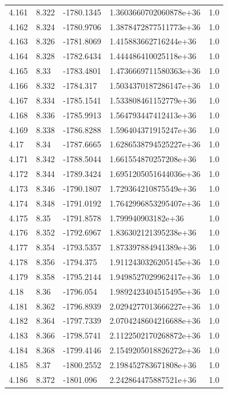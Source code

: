 \begin{tabular}{lllll}
4.161 & 8.322 & -1780.1345 & 1.3603660702060878e+36 & 1.0 \\
4.162 & 8.324 & -1780.9706 & 1.3878472877511773e+36 & 1.0 \\
4.163 & 8.326 & -1781.8069 & 1.415883662716244e+36 & 1.0 \\
4.164 & 8.328 & -1782.6434 & 1.444486410025118e+36 & 1.0 \\
4.165 & 8.33 & -1783.4801 & 1.4736669711580363e+36 & 1.0 \\
4.166 & 8.332 & -1784.317 & 1.5034370187286147e+36 & 1.0 \\
4.167 & 8.334 & -1785.1541 & 1.533808461152779e+36 & 1.0 \\
4.168 & 8.336 & -1785.9913 & 1.564793447412413e+36 & 1.0 \\
4.169 & 8.338 & -1786.8288 & 1.596404371915247e+36 & 1.0 \\
4.17 & 8.34 & -1787.6665 & 1.6286538794525227e+36 & 1.0 \\
4.171 & 8.342 & -1788.5044 & 1.661554870257208e+36 & 1.0 \\
4.172 & 8.344 & -1789.3424 & 1.6951205051644036e+36 & 1.0 \\
4.173 & 8.346 & -1790.1807 & 1.729364210875549e+36 & 1.0 \\
4.174 & 8.348 & -1791.0192 & 1.7642996853295407e+36 & 1.0 \\
4.175 & 8.35 & -1791.8578 & 1.799940903182e+36 & 1.0 \\
4.176 & 8.352 & -1792.6967 & 1.836302121395238e+36 & 1.0 \\
4.177 & 8.354 & -1793.5357 & 1.873397884941389e+36 & 1.0 \\
4.178 & 8.356 & -1794.375 & 1.9112430326205145e+36 & 1.0 \\
4.179 & 8.358 & -1795.2144 & 1.9498527029962417e+36 & 1.0 \\
4.18 & 8.36 & -1796.054 & 1.9892423404515495e+36 & 1.0 \\
4.181 & 8.362 & -1796.8939 & 2.0294277013666227e+36 & 1.0 \\
4.182 & 8.364 & -1797.7339 & 2.0704248604216688e+36 & 1.0 \\
4.183 & 8.366 & -1798.5741 & 2.1122502170268872e+36 & 1.0 \\
4.184 & 8.368 & -1799.4146 & 2.1549205018826272e+36 & 1.0 \\
4.185 & 8.37 & -1800.2552 & 2.198452783671808e+36 & 1.0 \\
4.186 & 8.372 & -1801.096 & 2.242864475887521e+36 & 1.0 \\

\end{tabular}
